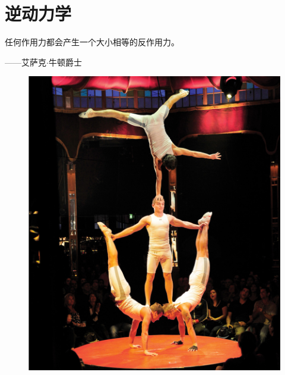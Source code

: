 \chapter{逆动力学} \label{chap:chap8}



任何作用力都会产生一个大小相等的反作用力。

\begin{flushright}
	——艾萨克$\cdot$牛顿爵士
\end{flushright}

\begin{figure}[!htb]
	\centering
	\includegraphics[width=1.0\linewidth]{chap8/8_0}
	\caption*{ \label{fig:8_0}}
\end{figure}



